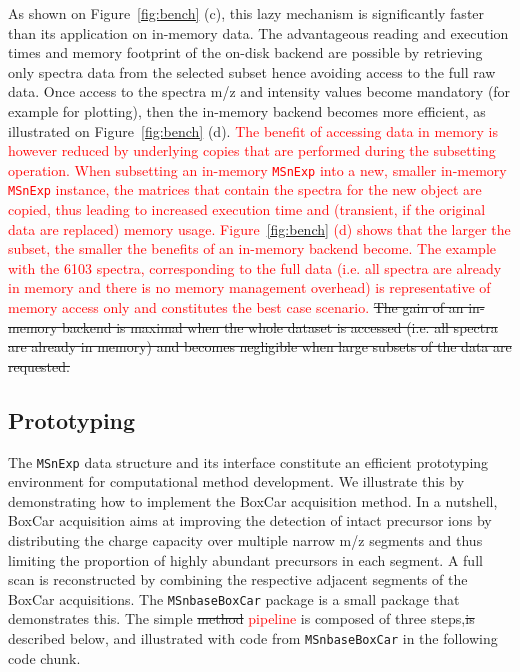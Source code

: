 \documentclass[journal=jacsat,manuscript=article]{achemso}\usepackage[]{graphicx}\usepackage[]{color}
\begin{document}
As shown on Figure~\ref{fig:bench} (c), this lazy mechanism is
significantly faster than its application on in-memory data. The
advantageous reading and execution times and memory footprint of the
on-disk backend are possible by retrieving only spectra data from the
selected subset hence avoiding access to the full raw data. Once
access to the spectra m/z and intensity values become mandatory (for
example for plotting), then the in-memory backend becomes more
efficient, as illustrated on Figure~\ref{fig:bench} (d).
\textcolor{red}{The benefit of accessing data in memory is however
  reduced by underlying copies that are performed during the
  subsetting operation. When subsetting an in-memory \texttt{MSnExp}
  into a new, smaller in-memory \texttt{MSnExp} instance, the matrices
  that contain the spectra for the new object are copied, thus leading
  to increased execution time and (transient, if the original data are
  replaced) memory usage. Figure~\ref{fig:bench} (d) shows that the
  larger the subset, the smaller the benefits of an in-memory backend
  become. The example with the 6103 spectra, corresponding to the full
  data (i.e. all spectra are already in memory and there is no memory
  management overhead) is representative of memory access only and
  constitutes the best case scenario. } \sout{The gain of an in-memory
  backend is maximal when the whole dataset is accessed (i.e. all
  spectra are already in memory) and becomes negligible when large
  subsets of the data are requested.}


\subsection{Prototyping}

The \texttt{MSnExp} data structure and its interface constitute an
efficient prototyping environment for computational method
development. We illustrate this by demonstrating how to implement the
BoxCar\cite{Meier:2018} acquisition method. In a nutshell, BoxCar
acquisition aims at improving the detection of intact precursor ions
by distributing the charge capacity over multiple narrow m/z segments
and thus limiting the proportion of highly abundant precursors in each
segment. A full scan is reconstructed by combining the respective
adjacent segments of the BoxCar acquisitions. The
\texttt{MSnbaseBoxCar} package\cite{MSnbaseBoxCar} is a small package
that demonstrates this. The simple \sout{method}
\textcolor{red}{pipeline} is composed of three steps,\sout{is}
described below, and illustrated with code from \texttt{MSnbaseBoxCar}
in the following code chunk.
\end{document}
